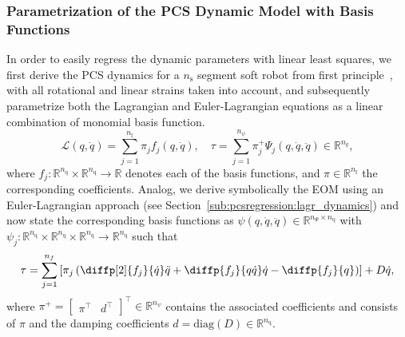 \subsubsection{Parametrization of the PCS Dynamic Model with Basis Functions}
In order to easily regress the dynamic parameters with linear least squares, we first derive the \gls{PCS} dynamics for a $n_\mathrm{s}$ segment soft robot from first principle~\cite{armanini2023soft, della2023model}, with all rotational and linear strains taken into account, and subsequently parametrize both the Lagrangian and Euler-Lagrangian equations as a linear combination of monomial basis function.
\begin{equation}\label{eq:pcsregression:lagrangian_basis_functions}
    \mathcal{L}(q, \dot{q}) = \sum_{j=1}^{n_\mathrm{f}} \pi_j f_j(q, \dot{q}), 
    \quad
    \tau = \sum_{j=1}^{n_\psi} \pi_j^{+}\Psi_j(q,\dot{q},\ddot{q}) \in \mathbb{R}^{n_q},
\end{equation}
where $f_j: \mathbb{R}^{n_\mathrm{q}} \times \mathbb{R}^{n_\mathrm{q}} \to \mathbb{R}$ denotes each of the basis functions, and $\pi \in \mathbb{R}^{n_\mathrm{f}}$ the corresponding coefficients.
Analog, we derive symbolically the \gls{EOM} using an Euler-Lagrangian approach (see Section~\ref{sub:pcsregression:lagr_dynamics}) and now state the corresponding basis functions as $\psi(q, \dot{q}, \ddot{q}) \in \mathbb{R}^{n_\Psi \times n_\mathrm{q}}$ with $\psi_j: \mathbb{R}^{n_\mathrm{q}} \times \mathbb{R}^{n_\mathrm{q}} \times \mathbb{R}^{n_\mathrm{q}} \to \mathbb{R}^{n_\mathrm{q}}$ such that
\begin{equation}
    \tau = \sum_{j=1}^{n_{f}} \left[ \pi_j \left( \diffp[2]{f_j}{{\dot{q}}}\ddot{q} + \diffp{f_j}{{q}{\dot{q}}}\dot{q} - \diffp{f_j}{{q}} \right) \right] + D\dot{q},
\end{equation}
where
$\pi^+ = \begin{bmatrix}
    \pi^\top & d^\top 
\end{bmatrix}^\top \in \mathbb{R}^{n_{\psi}}$ contains the associated coefficients and consists of $\pi$ and the damping coefficients $d = \mathrm{diag}(D) \in \mathbb{R}^{n_\mathrm{q}}$.

